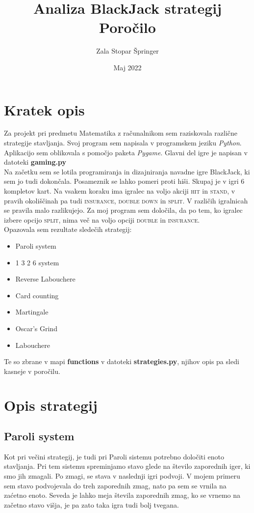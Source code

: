 \documentclass[a4paper, 16pt]{article}
\title{Analiza BlackJack strategij \\ Poročilo}
\date{Maj 2022}
\author{Zala Stopar Špringer}
\begin{document}
\maketitle

\section{Kratek opis}

Za projekt pri predmetu Matematika z računalnikom sem raziskovala različne strategije stavljanja. Svoj program sem napisala v programskem jeziku \textit{Python}. Aplikacijo sem oblikovala s pomočjo paketa \textit{Pygame}. Glavni del igre je napisan v datoteki \textbf{gaming.py}\\

\noindent Na začetku sem se lotila programiranja in dizajniranja navadne igre BlackJack, ki sem jo tudi dokončala. Posameznik se lahko pomeri proti hiši. Skupaj je v igri 6 kompletov kart. Na vsakem koraku ima igralec na voljo akciji \textsc{hit} in \textsc{stand}, v pravih okoliščinah pa tudi \textsc{insurance}, \textsc{double down} in \textsc{split}. V različih igralnicah se pravila malo razlikujejo. Za moj program sem določila, da po tem, ko igralec izbere opcijo \textsc{split}, nima več na voljo opciji \textsc{double} in \textsc{insurance}. \\


\noindent Opazovala sem rezultate sledečih strategij:
\begin{itemize}
\item Paroli system
\item 1 3 2 6 system
\item Reverse Labouchere
\item Card counting
\item Martingale
\item Oscar’s Grind
\item Labouchere
\end{itemize}
Te so zbrane v mapi \textbf{functions} v datoteki \textbf{strategies.py}, njihov opis pa sledi kasneje v poročilu.

\section{Opis strategij}

\subsection{Paroli system}
Kot pri večini strategij, je tudi pri Paroli sistemu potrebno določiti enoto stavljanja. Pri tem sistemu spreminjamo stavo glede na število zaporednih iger, ki smo jih zmagali. Po zmagi, se stava v naslednji igri podvoji. V mojem primeru sem stavo podvojevala do treh zaporednih zmag, nato pa sem se vrnila na zaćetno enoto. Seveda je lahko meja števila zaporednih zmag, ko se vrnemo na začetno stavo višja, je pa zato taka igra tudi bolj tvegana.
\end{document}
